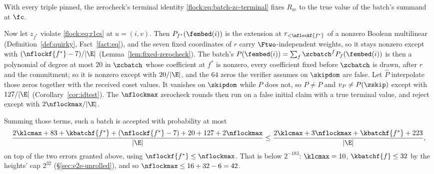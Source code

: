 With every triple pinned, the zerocheck's terminal identity \eqref{flock:eq:batch-zc-terminal} fixes $R_{\mathrm{zc}}$ to the true value of the batch's summand at $\fc$.

Now let $z_{f^\ast}$ violate \eqref{flock:eq:r1cs} at $u=(i,v)$. Then $P_{f^\ast}(\fembed(i))$ is the extension at $r_{<\nflockf{f^\ast}}$ of a nonzero Boolean multilinear (Definition~\ref{def:quirky}, Fact~\ref{fact:eq}), and the seven fixed coordinates of $r$ carry $\Ftwo$-independent weights, so it stays nonzero except with $(\nflockf{f^\ast}-7)/|\E|$ (Lemma~\ref{lem:fixed-zerocheck}). The batch's $P(\fembed(i))=\sum_f\zcbatch^fP_f(\fembed(i))$ is then a polynomial of degree at most $20$ in $\zcbatch$ whose coefficient at $f^\ast$ is nonzero, every coefficient fixed before $\zcbatch$ is drawn, after $r$ and the commitment; so it is nonzero except with $20/|\E|$, and the $64$ zeros the verifier assumes on $\skipdom$ are false. Let $\hat P$ interpolate those zeros together with the received coset values. It vanishes on $\skipdom$ while $P$ does not, so $\hat P\neq P$ and $v_P\neq P(\zskip)$ except with $127/|\E|$ (Corollary~\ref{cor:idtest}). The $\nflockmax$ zerocheck rounds then run on a false initial claim with a true terminal value, and reject except with $2\nflockmax/|\E|$.

Summing those terms, such a batch is accepted with probability at most
\[
\frac{2\klcmax+83+\kbatchf{f^\ast}+(\nflockf{f^\ast}-7)+20+127+2\nflockmax}{|\E|}\le\frac{2\klcmax+3\nflockmax+\kbatchf{f^\ast}+223}{|\E|},
\]
on top of the two errors granted above, using $\nflockf{f^\ast}\le\nflockmax$. That is below $2^{-183}$: $\klcmax=10$, $\kbatchf{f}\le32$ by the heights' cap $2^{32}$ (\S\ref{sec:e2e-unrolled}), and so $\nflockmax\le16+32-6=42$.
